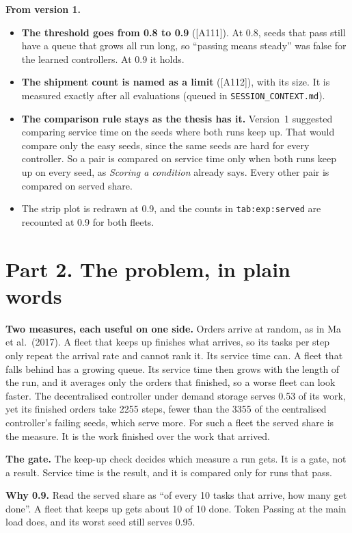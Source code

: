 \documentclass[11pt,a4paper]{article}
\begin{document}
\textbf{From version 1.}
\begin{itemize}[leftmargin=1.2em]
\item \textbf{The threshold goes from 0.8 to 0.9} ([A111]). At 0.8, seeds
  that pass still have a queue that grows all run long, so ``passing means
  steady'' was false for the learned controllers. At 0.9 it holds.
\item \textbf{The shipment count is named as a limit} ([A112]), with its
  size. It is measured exactly after all evaluations (queued in
  \texttt{SESSION\_CONTEXT.md}).
\item \textbf{The comparison rule stays as the thesis has it.} Version~1
  suggested comparing service time on the seeds where both runs keep up.
  That would compare only the easy seeds, since the same seeds are hard for
  every controller. So a pair is compared on service time only when both
  runs keep up on every seed, as \emph{Scoring a condition} already says.
  Every other pair is compared on served share.
\item The strip plot is redrawn at 0.9, and the counts in
  \texttt{tab:exp:served} are recounted at 0.9 for both fleets.
\end{itemize}

\section*{Part 2. The problem, in plain words}

\textbf{Two measures, each useful on one side.} Orders arrive at random, as
in Ma et al.\ (2017). A fleet that keeps up finishes what arrives, so its
tasks per step only repeat the arrival rate and cannot rank it. Its service
time can. A fleet that falls behind has a growing queue. Its service time
then grows with the length of the run, and it averages only the orders that
finished, so a worse fleet can look faster. The decentralised controller
under demand storage serves 0.53 of its work, yet its finished orders take
2255 steps, fewer than the 3355 of the centralised controller's failing
seeds, which serve more. For such a fleet the served share is the measure.
It is the work finished over the work that arrived.

\textbf{The gate.} The keep-up check decides which measure a run gets. It
is a gate, not a result. Service time is the result, and it is compared only
for runs that pass.

\textbf{Why 0.9.} Read the served share as ``of every 10 tasks that arrive,
how many get done''. A fleet that keeps up gets about 10 of 10 done.
Token Passing at the main load does, and its worst seed still serves 0.95.
\end{document}

